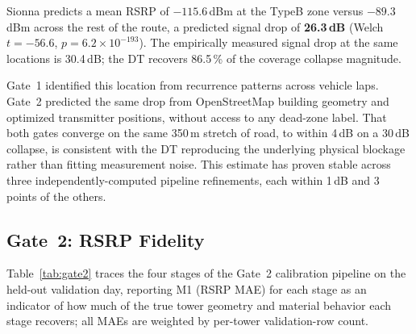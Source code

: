 \documentclass[conference]{IEEEtran}
\begin{document}
Sionna predicts a mean RSRP of $-115.6$\,dBm at the TypeB zone versus
$-89.3$\,dBm across the rest of the route, a predicted signal drop of
\textbf{26.3\,dB} (Welch $t = -56.6$, $p = 6.2\times10^{-193}$).
The empirically measured signal drop at the same locations is 30.4\,dB;
the DT recovers 86.5\,\% of the coverage collapse magnitude.

Gate~1 identified this location from recurrence patterns across vehicle laps.
Gate~2 predicted the same drop from OpenStreetMap building geometry and
optimized transmitter positions, without access to any dead-zone label.
That both gates converge on the same 350\,m stretch of road, to within
4\,dB on a 30\,dB collapse, is consistent with the DT reproducing
the underlying physical blockage rather than fitting measurement noise.
This estimate has proven stable across three independently-computed
pipeline refinements, each within 1\,dB and 3 points of the others.

\subsection{Gate~2: RSRP Fidelity}
\label{sec:gate2results}

Table~\ref{tab:gate2} traces the four stages of the Gate~2 calibration
pipeline on the held-out validation day, reporting M1 (RSRP MAE) for
each stage as an indicator of how much of the true tower geometry and
material behavior each stage recovers; all MAEs are weighted by
per-tower validation-row count.
\end{document}
